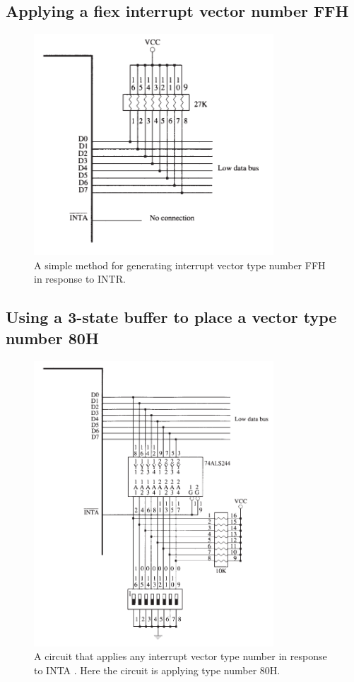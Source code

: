 \subsection{Applying a fiex interrupt vector number FFH}
\begin{figure}[h!]
  \centering
  \includegraphics[width = 0.8\textwidth]{./figures/INTR_FFH.png}
  \caption{A simple method for generating interrupt vector type number FFH in response to INTR.}
\end{figure}
\newpage
\subsection{Using a 3-state buffer to place a vector type number 80H}
\begin{figure}[h!]
  \includegraphics[width = 0.8\textwidth]{./figures/INTR_80H.png}
  \caption{A circuit that applies any interrupt vector type number in response to INTA . Here the circuit is applying type number 80H.}
\end{figure}
\newpage
